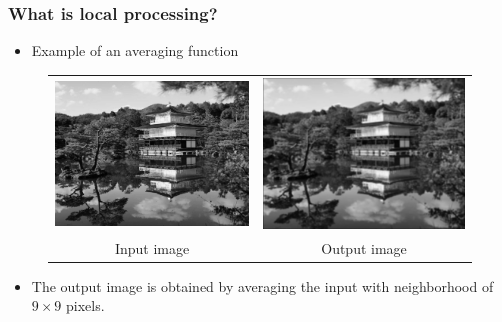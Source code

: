 \documentclass[english,11pt,table,handout]{beamer}
\begin{document}
\frame
{
	\frametitle{What is local processing?}
	\begin{itemize}
		\item Example of an averaging function
	\end{itemize}
	\centering
	\begin{figure}[!h]
		\begin{tabular}{cc}
			\includegraphics[scale=0.11]{kyoto_gray.jpg} &
			\includegraphics[scale=0.11]{kyoto_gray_smooth_9.jpg} \\
			Input image & Output image
		\end{tabular}
	\end{figure}

	\begin{itemize}
		\item The output image is obtained by averaging the input with neighborhood of $9 \times 9$ pixels.
	\end{itemize}
}
\end{document}
